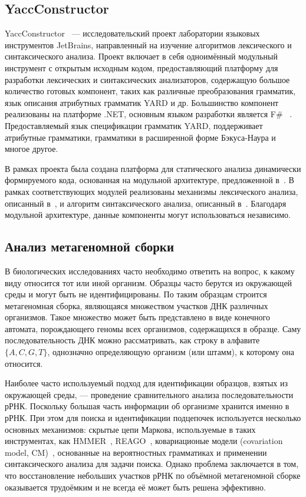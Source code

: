\documentclass[14pt]{matmex-diploma}
\begin{document}
\subsection{YaccConstructor}
YaccConstructor~\cite{YCUrl} --- исследовательский проект лаборатории языковых инструментов JetBrains, направленный на изучение алгоритмов лексического и синтаксического анализа. Проект включает в себя одноимённый модульный инструмент с открытым исходным кодом, предоставляющий платформу для разработки лексических и синтаксических анализаторов, содержащую большое количество готовых компонент, таких как различные преобразования грамматик, язык описания атрибутных грамматик YARD и др. Большинство компонент реализованы на платформе .NET, основным языком разработки является F\# ~\cite{FSharp}. Предоставляемый язык спецификации грамматик YARD, поддерживает атрибутные грамматики, грамматики в расширенной форме Бэкуса-Наура и многое другое.

В рамках проекта была создана платформа для статического анализа динамически формируемого кода, основанная на модульной архитектуре, предложенной в~\cite{GrigorievPhd}. В рамках соответствующих модулей реализованы механизмы лексического анализа, описанный в~\cite{polubelova}, и алгоритм синтаксического анализа, описанный в~\cite{RelaxedARNGLR}. Благодаря модульной архитектуре, данные компоненты могут использоваться независимо. 

\subsection{Анализ метагеномной сборки}
В биологических исследованиях часто необходимо ответить на вопрос, к какому виду относится тот или иной организм. Образцы часто берутся из окружающей среды и могут быть не идентифицированы. По таким образцам строится метагеномная сборка, являющаяся множеством участков ДНК различных организмов. Такое множество может быть представлено в виде конечного автомата, порождающего геномы всех организмов, содержащихся в образце. Саму последовательность ДНК можно рассматривать, как строку в алфавите $\{A, C, G, T\}$, однозначно определяющую организм (или штамм), к которому она относится. 

Наиболее часто используемый подход для идентификации образцов, взятых из окружающей среды, --- проведение сравнительного анализа последовательности рРНК. Поскольку большая часть информации об организме хранится именно в рРНК. При этом для поиска и идентификации подцепочек используется несколько основных механизмов: скрытые цепи Маркова, используемые в таких инструментах, как HMMER~\cite{hmmer}, REAGO~\cite{reago}, ковариационые модели (covariation model, CM)~\cite{durbin}, основанные на вероятностных грамматиках и применении синтаксического анализа для задачи поиска. Однако проблема заключается в том, что восстановление небольших участков рРНК по объёмной метагеномной сборке оказывается трудоёмким и не всегда её может быть решена эффективно. 
\end{document}
